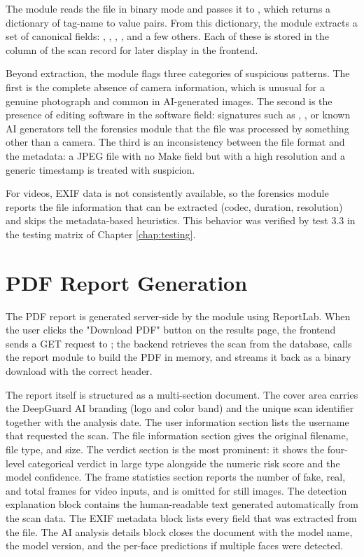 The module reads the file in binary mode and passes it to , which returns a dictionary of tag-name to value pairs. From this dictionary, the module extracts a set of canonical fields: , , , , and a few others. Each of these is stored in the  column of the scan record for later display in the frontend.

Beyond extraction, the module flags three categories of suspicious patterns. The first is the complete absence of camera information, which is unusual for a genuine photograph and common in AI-generated images. The second is the presence of editing software in the software field: signatures such as , , or known AI generators tell the forensics module that the file was processed by something other than a camera. The third is an inconsistency between the file format and the metadata: a JPEG file with no Make field but with a high resolution and a generic timestamp is treated with suspicion.

For videos, EXIF data is not consistently available, so the forensics module reports the file information that can be extracted (codec, duration, resolution) and skips the metadata-based heuristics. This behavior was verified by test 3.3 in the testing matrix of Chapter \ref{chap:testing}.

\section{PDF Report Generation}

The PDF report is generated server-side by the  module using ReportLab. When the user clicks the "Download PDF" button on the results page, the frontend sends a GET request to ; the backend retrieves the scan from the database, calls the report module to build the PDF in memory, and streams it back as a binary download with the correct  header.

The report itself is structured as a multi-section document. The cover area carries the DeepGuard AI branding (logo and color band) and the unique scan identifier together with the analysis date. The user information section lists the username that requested the scan. The file information section gives the original filename, file type, and size. The verdict section is the most prominent: it shows the four-level categorical verdict in large type alongside the numeric risk score and the model confidence. The frame statistics section reports the number of fake, real, and total frames for video inputs, and is omitted for still images. The detection explanation block contains the human-readable text generated automatically from the scan data. The EXIF metadata block lists every field that was extracted from the file. The AI analysis details block closes the document with the model name, the model version, and the per-face predictions if multiple faces were detected.

